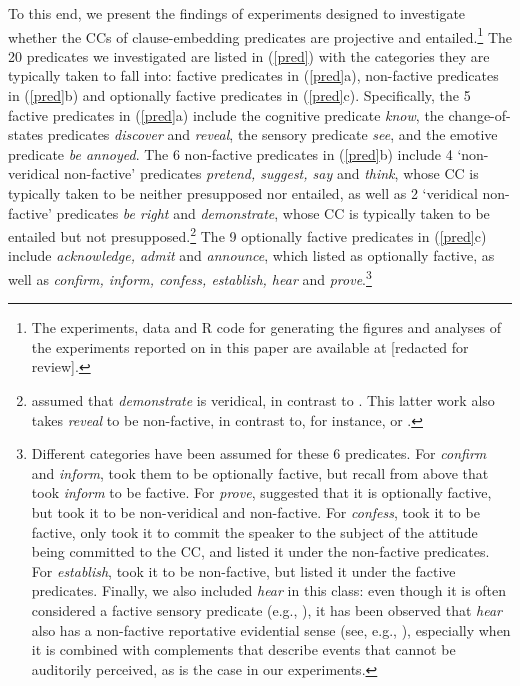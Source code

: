 \documentclass[11pt,fleqn]{article}
\newcommand{\6}{\mbox{$[\hspace*{-.6mm}[$}}
\newcommand{\9}{\mbox{$]\hspace*{-.6mm}]$}}
\begin{document}
To this end, we present the findings of experiments designed to investigate whether the CCs of clause-embedding predicates are projective and entailed.\footnote{\label{f-github}The experiments, data and R code for generating the figures and analyses of the experiments reported on in this paper are available at [redacted for review].}
The 20 predicates we investigated are listed in (\ref{pred}) with the categories they are typically taken to fall into: factive predicates in (\ref{pred}a), non-factive predicates in (\ref{pred}b) and optionally factive predicates in (\ref{pred}c). Specifically, the 5 factive predicates in (\ref{pred}a) include the cognitive predicate {\em know}, the change-of-states predicates {\em discover} and {\em reveal}, the sensory predicate {\em see}, and the emotive predicate {\em be annoyed}. The 6 non-factive predicates in (\ref{pred}b) include 4 `non-veridical non-factive' predicates {\em pretend, suggest, say} and {\em think}, whose CC is typically taken to be neither presupposed nor entailed, as well as  2 `veridical non-factive' predicates {\em be right} and {\em demonstrate}, whose CC is typically taken to be entailed but not presupposed.\footnote{\citet{anand-hacquard2014} assumed that {\em demonstrate} is veridical, in contrast to \citealt{anand-etal2019}. This latter work also takes {\em reveal} to be non-factive, in contrast to, for instance, \citealt{egre2008,wyse} or \citealt{tbd-variability}.}  The 9 optionally factive predicates in (\ref{pred}c) include {\em acknowledge, admit} and {\em announce}, which \citealt{kiparsky-kiparsky70} listed as optionally factive, as well as {\em confirm, inform, confess, establish, hear} and {\em prove}.\footnote{Different categories have been assumed for these 6 predicates. For {\em confirm} and {\em inform}, \citet{anand-hacquard2014} took them to be optionally factive, but recall from above that \citet{schlenker10} took {\em inform} to be factive. For {\em prove}, \citet{white-rawlins-nels2018} suggested that it is optionally factive, but \citet{anand-hacquard2014} took it to be non-veridical and non-factive. For {\em confess}, \citet{swanson2012} took it to be factive, \citet{karttunen2016} only took it to commit the speaker to the subject of the attitude being committed to the CC, and \citet{wyse} listed it under the non-factive predicates. For {\em establish}, \citet{swanson2012} took it to be non-factive, but \citet{wyse} listed it under the factive predicates. Finally, we also included {\em hear} in this class: even though it is often considered a factive sensory predicate (e.g., \citealt{beaver-belly,anand-hacquard2014}), it has been observed that {\em hear} also has a non-factive reportative evidential sense (see, e.g., \citealt{anderson86,simons07}), especially when it is combined with complements that describe events that cannot be auditorily perceived, as is the case in our experiments.}
\end{document}
